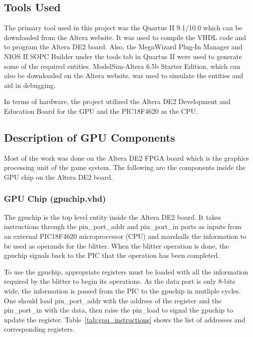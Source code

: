 \documentclass{report}
\begin{document}
\subsection{Tools Used}
The primary tool used in this project was the Quartus II 9.1/10.0 which 
can be downloaded from the Altera website. It was used to compile the VHDL 
code and to program the Altera DE2 board. Also, the MegaWizard Plug-In 
Manager and NIOS II SOPC Builder under the tools tab in Quartus II were 
used to generate some of the required entities. ModelSim-Altera 6.5b 
Starter Edition, which can also be downloaded on the Altera website, was 
used to simulate the entities and aid in debugging.

In terms of hardware, the project utilized the Altera DE2 Development 
and Education Board for the GPU and the PIC18F4620 as the CPU.

\subsection{Description of GPU Components}
Most of the work was done on the Altera DE2 FPGA board which is the 
graphics processing unit of the game system. The following are the 
components inside the GPU chip on the Altera DE2 board.

\subsubsection{GPU Chip (gpuchip.vhd)}
The gpuchip is the top level entity inside the Altera DE2 board. It 
takes instructions through the pin\_port\_addr and pin\_port\_in ports
as inputs from an external PIC18F4620 microprocessor (CPU) and marshalls
the information to be used as operands for the blitter. When the blitter
operation is done, the gpuchip signals back to the PIC that the
operation has been completed.

To use the gpuchip, appropriate registers must be loaded with all the information 
required by the blitter to begin its operations. As the data port is only 8-bits wide,
the information is passed from the PIC to the gpuchip in mutliple cycles. One should
load pin\_port\_addr with the address of the register and the 
pin\_port\_in with the data, then raise the pin\_load to signal the
gpuchip to update the register. Table~\ref{tab:gpu_instructions}
 shows the list of addresses and corresponding registers.
\end{document}
